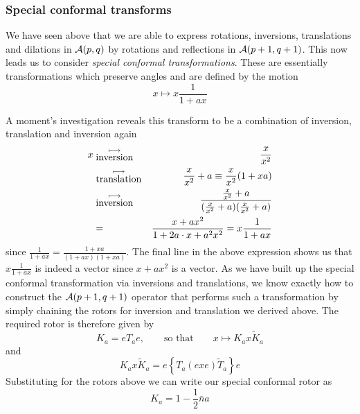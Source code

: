 \subsubsection{Special conformal transforms}


We have seen above that we are able to express rotations,
inversions, translations and dilations in ${\mathcal{A}}(p,q)$
by rotations and reflections in  ${\mathcal{A}}(p+1,q+1)$. This
now leads us to consider \emph{special conformal
transformations}. These are essentially transformations
which preserve angles and are defined by the motion
%
\begin{equation}
x \mapsto  x \frac{1}{1 + ax}
\end{equation}
%

A moment's investigation reveals this transform to be 
a combination of inversion, translation and inversion again
%
\begin{eqnarray}
x   & \stackrel{\longmapsto}{_{\mbox{inversion}}} & \frac{x}{x^2} \nonumber \\
     &  \stackrel{\longmapsto}{_{\mbox{translation}}} & \frac{x}{x^2} + a  \equiv \frac{x}{x^2}(1+xa)  \nonumber \\
     &  \stackrel{\longmapsto}{_{\mbox{inversion}}} & \frac{\frac{x}{x^2} + a}{(\frac{x}{x^2} + a)(\frac{x}{x^2} + a)} \nonumber \\
   & = & \frac{x+ ax^2}{1+2a\cdot x + a^2x^2} = x\frac{1}{1 + ax}
\end{eqnarray}
%
since $\frac{1}{1+ax} = \frac{1+xa}{(1+ax)(1+xa)}$. The
final line in the above expression shows us that
$x\frac{1}{1 + ax}$ is indeed a vector since $x+ ax^2$ is
a vector. As we have built up the special conformal
transformation via inversions and translations, we know
exactly how to construct the ${\mathcal{A}}(p+1,q+1)$ operator
that performs such a transformation by simply chaining the
rotors for inversion and translation we derived above.
The required rotor is therefore given by
%
\begin{equation}
 K_a = eT_a e,\qquad {\mbox{so that}} \qquad x\mapsto K_a x \tilde{K}_a
\end{equation}
%
and
\begin{equation}
   K_a x \tilde{K}_a = e\left\{ T_a(exe)\tilde{T}_a\right\}e
\end{equation}
%
Substituting for the rotors above we can write our special conformal rotor as
%
\begin{equation}
K_a = 1 - \frac{1}{2}\bar{n}a
\end{equation}
